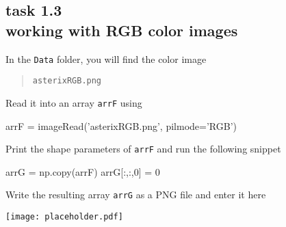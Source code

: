 
\subsection*{task 1.3 \\[1ex] working with RGB color images}

In the \texttt{Data} folder, you will find the color image
\begin{quote}
    \texttt{asterixRGB.png}
\end{quote}
Read it into an array \texttt{arrF} using 
\begin{python}
arrF = imageRead('asterixRGB.png', pilmode='RGB')
\end{python}

Print the shape parameters of \texttt{arrF} and run the following snippet
\begin{python}
arrG = np.copy(arrF)
arrG[:,:,0] = 0
\end{python}

Write the resulting array \texttt{arrG} as a PNG file and enter it here
\begin{center}
\texttt{[image: placeholder.pdf]} 
\end{center}



